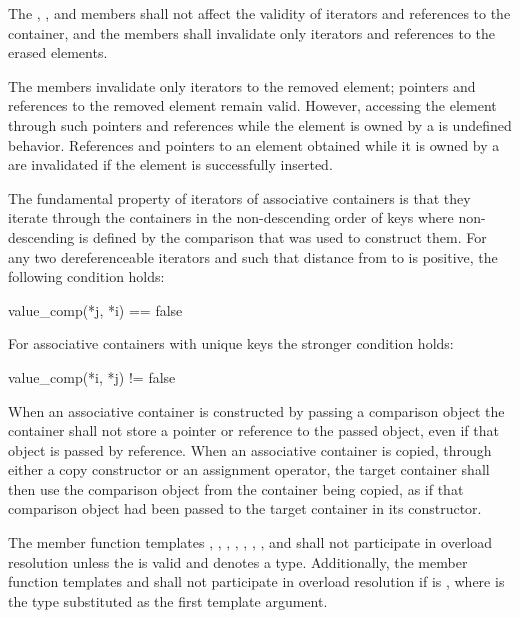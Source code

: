 \pnum
The , , and  members
shall not affect the validity of
iterators and references to the container,
and the  members shall invalidate only iterators and
references to the erased elements.

\pnum
The  members invalidate only iterators to the removed element;
pointers and references to the removed element remain valid. However, accessing
the element through such pointers and references while the element is owned by
a  is undefined behavior. References and pointers to an element
obtained while it is owned by a  are invalidated if the element
is successfully inserted.

\pnum
The fundamental property of iterators of associative containers is that they iterate through the containers
in the non-descending order of keys where non-descending is defined by the comparison that was used to
construct them.
For any two dereferenceable iterators
and
such that distance from
to
is positive, the following condition holds:

\begin{codeblock}
value_comp(*j, *i) == false
\end{codeblock}

\pnum
For associative containers with unique keys the stronger condition holds:

\begin{codeblock}
value_comp(*i, *j) != false
\end{codeblock}

\pnum
When an associative container is constructed by passing a comparison object the
container shall not store a pointer or reference to the passed object,
even if that object is passed by reference.
When an associative container is copied, through either a copy constructor
or an assignment operator,
the target container shall then use the comparison object from the container
being copied,
as if that comparison object had been passed to the target container in
its constructor.

\pnum
The member function templates
, , ,
, , ,
, and 
shall not participate in overload resolution unless
the   is valid
and denotes a type.
Additionally, the member function templates  and 
shall not participate in overload resolution if
is ,
where  is the type substituted as the first template argument.

